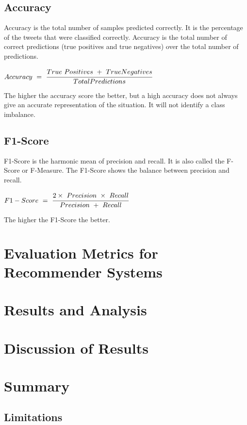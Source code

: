 \subsection*{Accuracy}
Accuracy is the total number of samples predicted correctly. It is the percentage of the tweets that were classified correctly. Accuracy is the total number of correct predictions (true positives and true negatives) over the total number of predictions. 
\begin{center}
    $Accuracy\ =\ \cfrac{True\ Positives\ +\ True Negatives}{Total Predictions}$
\end{center}
The higher the accuracy score the better, but a high accuracy does not always give an accurate representation of the situation. It will not identify a class imbalance.

\subsection*{F1-Score}
F1-Score is the harmonic mean of precision and recall. It is also called the F-Score or F-Measure. The F1-Score shows the balance between precision and recall. 
\begin{center}
    $F1-Score\ =\ \cfrac{2 \times\ Precision\ \times\ Recall}{Precision\ +\ Recall}$
\end{center}
The higher the F1-Score the better.

\section{Evaluation Metrics for Recommender Systems}

\section{Results and Analysis}

\section{Discussion of Results}

\section{Summary}

\subsection*{Limitations}

